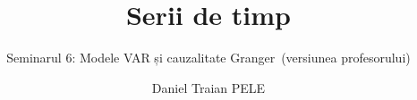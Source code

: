 \title[Serii de timp]{Serii de timp}
\subtitle{Seminarul 6: Modele VAR și cauzalitate Granger\ifsolutions\ (versiunea profesorului)\fi}
\author[D.T. Pele]{Daniel Traian PELE}
\date{}

\providecommand{\tsaapplink}[3]{\hypertarget{#2}{}\hyperlink{#1}{\beamergotobutton{#3}}}  %
\providecommand{\tsaappback}[2]{\begin{tikzpicture}[remember picture,overlay]\node[anchor=south east] at ([xshift=-3mm,yshift=7mm]current page.south east){\hyperlink{#1}{\beamerreturnbutton{#2}}};\end{tikzpicture}}  %
\providecommand{\tsachlink}[2]{\href{#1}{#2}}  %
\providecommand{\tsachlinkt}[2]{\href{#1}{\usebeamercolor[fg]{frametitle}#2}}  %


